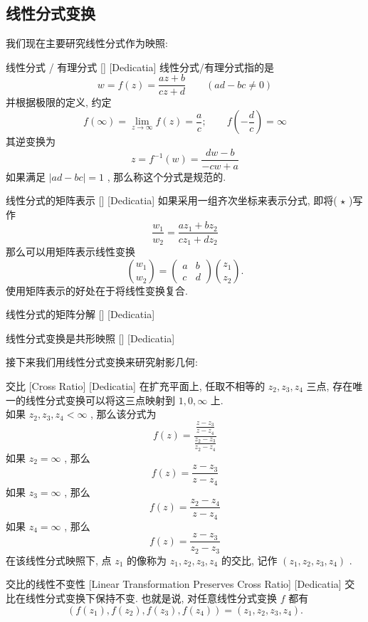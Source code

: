 \documentclass[UTF8]{ctexart}
\begin{document}
\subsection{线性分式变换}
我们现在主要研究线性分式作为映照: 
\begin{dfn}
    [UUID]
    {线性分式 / 有理分式}
    []
    [Dedicatia]
    线性分式/有理分式指的是
    \[w=f(z)=\frac{az+b}{cz+d}\qquad(ad-bc\neq 0)\tag{ \( \star \) }\]
    并根据极限的定义, 约定
    \[f(\infty)=\lim_{z\to\infty}f(z)=\dfrac{a}{c};\qquad f\left(-\dfrac{d}{c}\right)=\infty\]
    其逆变换为
    \[z=f^{-1}(w)=\frac{dw-b}{-cw+a}\]
    如果满足 \( |ad-bc|=1 \) , 那么称这个分式是规范的. 
\end{dfn}
\begin{ppt}
    [UUID]
    {线性分式的矩阵表示}
    []
    [Dedicatia]
    如果采用一组齐次坐标来表示分式, 即将( \( \star \) )写作
    \[\frac{w_1}{w_2}=\frac{az_1+bz_2}{cz_1+dz_2}\]
    那么可以用矩阵表示线性变换
    \[\binom{w_1}{w_2}=\begin{pmatrix}
        a&b\\c&d
    \end{pmatrix}\binom{z_1}{z_2}.\]
    使用矩阵表示的好处在于将线性变换复合. 
\end{ppt}
\begin{ppt}
    [UUID]
    {线性分式的矩阵分解}
    []
    [Dedicatia]
\end{ppt}
\begin{ppt}
    [UUID]
    {线性分式变换是共形映照}
    []
    [Dedicatia]
\end{ppt}
接下来我们用线性分式变换来研究射影几何: 
\begin{dfn}
    [UUID]
    {交比}
    [Cross Ratio]
    [Dedicatia]
    在扩充平面上, 任取不相等的 \( z_2,z_3,z_4 \) 三点, 存在唯一的线性分式变换可以将这三点映射到 \( 1,0,\infty \) 上. \\
    如果 \( z_2,z_3,z_4<\infty \) , 那么该分式为
    \[f(z)=\frac{\frac{z-z_3}{z-z_4}}{\frac{z_2-z_3}{z_2-z_4}}\]
    如果 \( z_2=\infty \) , 那么
    \[f(z)=\frac{z-z_3}{z-z_4}\]
    如果 \( z_3=\infty \) , 那么
    \[f(z)=\frac{z_2-z_4}{z-z_4}\]
    如果 \( z_4=\infty \) , 那么
    \[f(z)=\frac{z-z_3}{z_2-z_3}\]
    在该线性分式映照下, 点 \( z_1 \) 的像称为 \( z_1,z_2,z_3,z_4 \) 的交比, 记作 \( (z_1,z_2,z_3,z_4) \) .
\end{dfn}
\begin{ppt}
    [UUID]
    {交比的线性不变性}
    [Linear Transformation Preserves Cross Ratio]
    [Dedicatia]
    交比在线性分式变换下保持不变. 也就是说, 对任意线性分式变换 \( f \) 都有
    \[(f(z_1),f(z_2),f(z_3),f(z_4))=(z_1,z_2,z_3,z_4).\]
\end{ppt}
\end{document}
